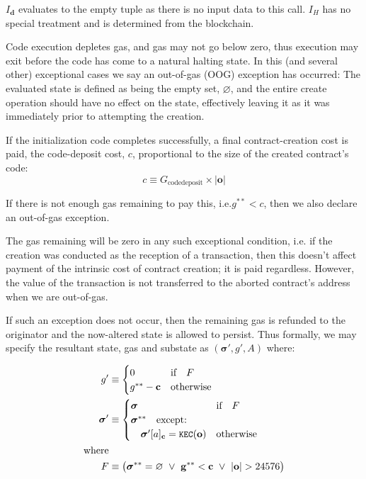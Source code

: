 \documentclass[9pt,oneside]{amsart}
\makeatletter
\newcommand*\ie{i.e.\@\xspace}
\makeatother
\begin{document}
\begin{multicols}{2}
$I_\mathbf{d}$ evaluates to the empty tuple as there is no input data to this call. $I_H$ has no special treatment and is determined from the blockchain.

Code execution depletes gas, and gas may not go below zero, thus execution may exit before the code has come to a natural halting state. In this (and several other) exceptional cases we say an out-of-gas (OOG) exception has occurred: The evaluated state is defined as being the empty set, $\varnothing$, and the entire create operation should have no effect on the state, effectively leaving it as it was immediately prior to attempting the creation.

If the initialization code completes successfully, a final contract-creation cost is paid, the code-deposit cost, $c$, proportional to the size of the created contract's code:
\begin{equation}
c \equiv G_{\mathrm{codedeposit}} \times |\mathbf{o}|
\end{equation}

If there is not enough gas remaining to pay this, \ie $g^{**} < c$, then we also declare an out-of-gas exception.

The gas remaining will be zero in any such exceptional condition, \ie if the creation was conducted as the reception of a transaction, then this doesn't affect payment of the intrinsic cost of contract creation; it is paid regardless. However, the value of the transaction is not transferred to the aborted contract's address when we are out-of-gas.

If such an exception does not occur, then the remaining gas is refunded to the originator and the now-altered state is allowed to persist. Thus formally, we may specify the resultant state, gas and substate as $(\boldsymbol{\sigma}', g', A)$ where:

\begin{align}
\quad g' &\equiv \begin{cases}
0 & \text{if} \quad F \\
g^{**} - \mathbf{c} & \text{otherwise} \\
\end{cases} \\
\quad \boldsymbol{\sigma}' &\equiv  \begin{cases}
\boldsymbol{\sigma} & \text{if} \quad F \\
\boldsymbol{\sigma}^{**} \quad \text{except:} & \\
\quad\boldsymbol{\sigma}'[a]_\mathbf{c} = \texttt{\small KEC}(\mathbf{o}) & \text{otherwise}
\end{cases} \\
\nonumber \text{where} \\
F &\equiv \big(\boldsymbol{\sigma}^{**} = \varnothing \ \vee\  \mathbf{g}^{**} < \mathbf{c} \ \vee\  |\mathbf{o}| > 24576\big)
\end{align}


\end{multicols}
\end{document}
